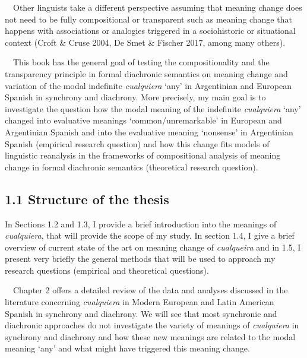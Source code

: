 \begin{styleStandard}
\ \ Other linguists take a different perspective assuming that meaning change does not need to be fully compositional or transparent such as meaning change that happens with associations or analogies triggered in a sociohistoric or situational context (Croft \& Cruse 2004, De Smet \& Fischer 2017, among many others). 
\end{styleStandard}

\begin{styleStandard}
\ \ This book has the general goal of testing the compositionality and the transparency principle in formal diachronic semantics on meaning change and variation of the modal indefinite \textit{cualquiera} ‘any’ in Argentinian and European Spanish in synchrony and diachrony. More precisely, my main goal is to investigate the question how the modal meaning of the indefinite \textit{cualquiera} ‘any’ changed into evaluative meanings ‘common/unremarkable’ in European and Argentinian Spanish and into the evaluative meaning ‘nonsense’ in Argentinian Spanish (empirical research question) and how this change fits models of linguistic reanalysis in the frameworks of compositional analysis of meaning change in formal diachronic semantics (theoretical research question).
\end{styleStandard}

\subsection[1.1 Structure of the thesis]{1.1 Structure of the thesis}
\begin{styleStandard}
In Sections 1.2 and 1.3, I provide a brief introduction into the meanings of \textit{cualquiera}, that will provide the scope of my study. In section 1.4, I give a brief overview of current state of the art on meaning change of \textit{cualqueira} and in 1.5, I present very briefly the general methods that will be used to approach my research questions (empirical and theoretical questions). 
\end{styleStandard}

\begin{styleStandard}
\ \ Chapter 2 offers a detailed review of the data and analyses discussed in the literature concerning \textit{cualquiera} in Modern European and Latin American Spanish in synchrony and diachrony. We will see that most synchronic and diachronic approaches do not investigate the variety of meanings of \textit{cualquiera} in synchrony and diachrony and how these new meanings are related to the modal meaning ‘any’ and what might have triggered this meaning change.
\end{styleStandard}

